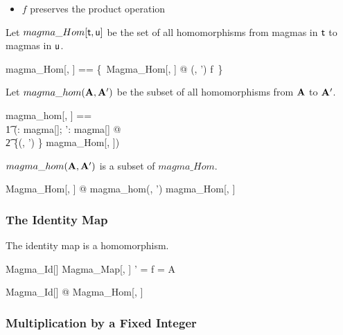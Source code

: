 \documentclass{amsart}
\begin{document}
\begin{itemize}
	\item $f$ preserves the product operation
\end{itemize}

Let $magma\_Hom[\mathsf{t}, \mathsf{u}]$ be the set of all homomorphisms
from magmas in $\mathsf{t}$ to magmas in $\mathsf{u}$.

\begin{zed}
	magma\_Hom[\genT, \genU] == \{~Magma\_Hom[\genT, \genU] @ (\strucA, \strucA') \mapsto f~\}
\end{zed}

Let $magma\_hom(\mathbf{A}, \mathbf{A}')$ be the subset of all homomorphisms from 
$\mathbf{A}$ to $\mathbf{A}'$.

\begin{zed}
	magma\_hom[\genT, \genU] == \\
	\t1	(\lambda \strucA: magma[\genT]; \strucA': magma[\genU] @ \\
	\t2		\{(\strucA, \strucA') \} \dres magma\_Hom[\genT, \genU])
\end{zed}

\begin{remark} $magma\_hom(\mathbf{A}, \mathbf{A}')$ is a subset of $magma\_Hom$.

\begin{zed}
	\forall Magma\_Hom[\setT, \setU] @ magma\_hom(\strucA, \strucA') \subseteq magma\_Hom[\setT, \setU]
\end{zed}

\end{remark}

\subsubsection{The Identity Map}

\begin{example} The identity map is a homomorphism.

\begin{schema}{Magma\_Id}[\genT]
	Magma\_Map[\genT, \genT]
\where
	\strucA' = \strucA
\also
	f = \id A
\end{schema}

\begin{zed}
	\forall Magma\_Id[\setT] @ Magma\_Hom[\setT, \setT]
\end{zed}

\end{example}

\subsubsection{Multiplication by a Fixed Integer}
\end{document}
